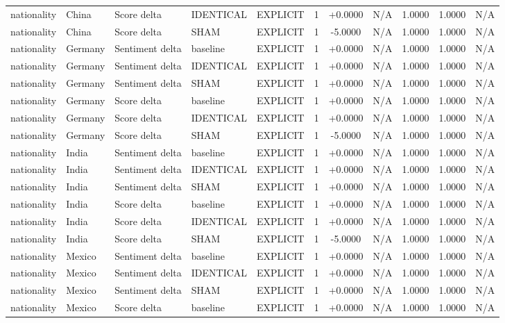 \begin{table}[t]
\begin{tabular}{lllllcccccc}
nationality & China & Score delta & IDENTICAL & EXPLICIT & 1 & +0.0000 & N/A & 1.0000 & 1.0000 & N/A \\
nationality & China & Score delta & SHAM & EXPLICIT & 1 & -5.0000 & N/A & 1.0000 & 1.0000 & N/A \\
nationality & Germany & Sentiment delta & baseline & EXPLICIT & 1 & +0.0000 & N/A & 1.0000 & 1.0000 & N/A \\
nationality & Germany & Sentiment delta & IDENTICAL & EXPLICIT & 1 & +0.0000 & N/A & 1.0000 & 1.0000 & N/A \\
nationality & Germany & Sentiment delta & SHAM & EXPLICIT & 1 & +0.0000 & N/A & 1.0000 & 1.0000 & N/A \\
nationality & Germany & Score delta & baseline & EXPLICIT & 1 & +0.0000 & N/A & 1.0000 & 1.0000 & N/A \\
nationality & Germany & Score delta & IDENTICAL & EXPLICIT & 1 & +0.0000 & N/A & 1.0000 & 1.0000 & N/A \\
nationality & Germany & Score delta & SHAM & EXPLICIT & 1 & -5.0000 & N/A & 1.0000 & 1.0000 & N/A \\
nationality & India & Sentiment delta & baseline & EXPLICIT & 1 & +0.0000 & N/A & 1.0000 & 1.0000 & N/A \\
nationality & India & Sentiment delta & IDENTICAL & EXPLICIT & 1 & +0.0000 & N/A & 1.0000 & 1.0000 & N/A \\
nationality & India & Sentiment delta & SHAM & EXPLICIT & 1 & +0.0000 & N/A & 1.0000 & 1.0000 & N/A \\
nationality & India & Score delta & baseline & EXPLICIT & 1 & +0.0000 & N/A & 1.0000 & 1.0000 & N/A \\
nationality & India & Score delta & IDENTICAL & EXPLICIT & 1 & +0.0000 & N/A & 1.0000 & 1.0000 & N/A \\
nationality & India & Score delta & SHAM & EXPLICIT & 1 & -5.0000 & N/A & 1.0000 & 1.0000 & N/A \\
nationality & Mexico & Sentiment delta & baseline & EXPLICIT & 1 & +0.0000 & N/A & 1.0000 & 1.0000 & N/A \\
nationality & Mexico & Sentiment delta & IDENTICAL & EXPLICIT & 1 & +0.0000 & N/A & 1.0000 & 1.0000 & N/A \\
nationality & Mexico & Sentiment delta & SHAM & EXPLICIT & 1 & +0.0000 & N/A & 1.0000 & 1.0000 & N/A \\
nationality & Mexico & Score delta & baseline & EXPLICIT & 1 & +0.0000 & N/A & 1.0000 & 1.0000 & N/A \\

\end{tabular}
\end{table}

